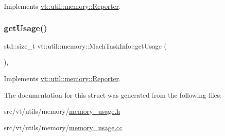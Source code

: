 Implements \hyperlink{structvt_1_1util_1_1memory_1_1_reporter_a83fc36e9cff3ce2deedf1d4546694713}{vt\+::util\+::memory\+::\+Reporter}.

\mbox{\label{structvt_1_1util_1_1memory_1_1_mach_task_info_a8d610d4ca50ad62ef2dc623713a67b7d}} 
\subsubsection{\texorpdfstring{get\+Usage()}{getUsage()}}
{\footnotesize\ttfamily std\+::size\+\_\+t vt\+::util\+::memory\+::\+Mach\+Task\+Info\+::get\+Usage (\begin{DoxyParamCaption}{ }\end{DoxyParamCaption})\hspace{0.3cm}{\ttfamily [override]}, {\ttfamily [virtual]}}



Implements \hyperlink{structvt_1_1util_1_1memory_1_1_reporter_a372574f51fdb68077cd3d227ee373de5}{vt\+::util\+::memory\+::\+Reporter}.



The documentation for this struct was generated from the following files\+:\begin{DoxyCompactItemize}
\item 
src/vt/utils/memory/\hyperlink{memory__usage_8h}{memory\+\_\+usage.\+h}\item 
src/vt/utils/memory/\hyperlink{memory__usage_8cc}{memory\+\_\+usage.\+cc}\end{DoxyCompactItemize}
